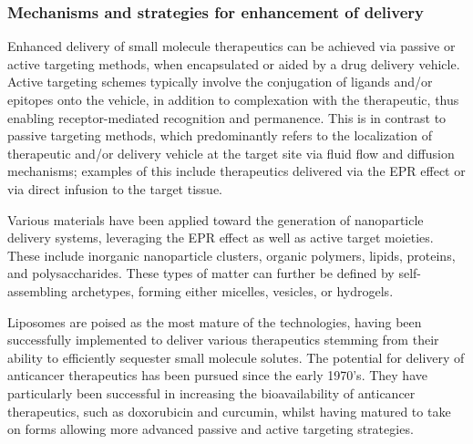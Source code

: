 \begin{refsection}
\subsubsection{Mechanisms and strategies for enhancement of delivery}
Enhanced delivery of small molecule therapeutics can be achieved via passive or
active targeting methods, when encapsulated or aided by a drug delivery vehicle.
Active targeting schemes typically involve the conjugation of ligands and/or
epitopes onto the vehicle, in addition to complexation with the therapeutic,
thus enabling receptor-mediated recognition and permanence.\cite{Singh2009} This
is in contrast to passive targeting methods, which predominantly refers to the
localization of therapeutic and/or delivery vehicle at the target site
via fluid flow and diffusion mechanisms; examples of this include therapeutics
delivered via the EPR effect or via direct infusion to the target
tissue.\cite{Singh2009}

Various materials have been applied toward the generation of nanoparticle
delivery systems, leveraging the EPR effect as well as active target moieties.
These include inorganic nanoparticle clusters,\cite{Thomas2003} organic
polymers,\cite{Yallapu2010b} lipids,\cite{Ranson1996}
proteins,\cite{Mackay2008} and polysaccharides.\cite{Stenekes2000} These types
of matter can further be defined by self-assembling archetypes, forming either
micelles, vesicles, or hydrogels.\cite{Branco2009}

Liposomes are poised as the most mature of the technologies, having been
successfully implemented to deliver various therapeutics stemming from their
ability to efficiently sequester small molecule
solutes.\cite{Ranson1996,Sessa1968,Bangham1965,Bangham1974} The potential for
delivery of anticancer therapeutics has been pursued since the early
1970's.\cite{Gregoriadis1974} They have particularly been successful in
increasing the bioavailability of anticancer therapeutics, such as doxorubicin
and curcumin, whilst having matured to take on forms allowing more advanced
passive and active targeting strategies.\cite{Al-Jamal2012,Huang1994,Li2007}


\end{refsection}
